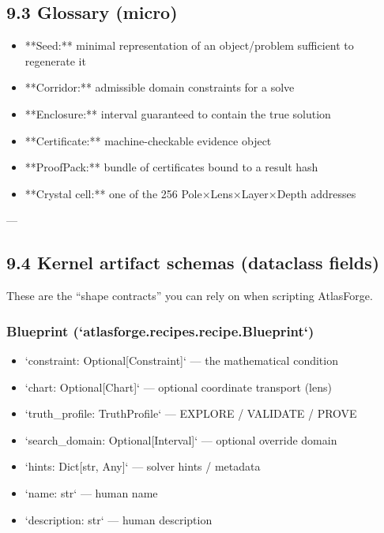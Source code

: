 \documentclass[11pt]{article}
\begin{document}
\subsection{9.3 Glossary (micro)}

\begin{itemize}
\item **Seed:** minimal representation of an object/problem sufficient to regenerate it
\item **Corridor:** admissible domain constraints for a solve
\item **Enclosure:** interval guaranteed to contain the true solution
\item **Certificate:** machine-checkable evidence object
\item **ProofPack:** bundle of certificates bound to a result hash
\item **Crystal cell:** one of the 256 Pole×Lens×Layer×Depth addresses
\end{itemize}

---

\subsection{9.4 Kernel artifact schemas (dataclass fields)}

These are the “shape contracts” you can rely on when scripting AtlasForge.

\subsubsection{Blueprint (`atlasforge.recipes.recipe.Blueprint`)}
\begin{itemize}
\item `constraint: Optional[Constraint]` — the mathematical condition
\item `chart: Optional[Chart]` — optional coordinate transport (lens)
\item `truth\_profile: TruthProfile` — EXPLORE / VALIDATE / PROVE
\item `search\_domain: Optional[Interval]` — optional override domain
\item `hints: Dict[str, Any]` — solver hints / metadata
\item `name: str` — human name
\item `description: str` — human description
\end{itemize}
\end{document}
